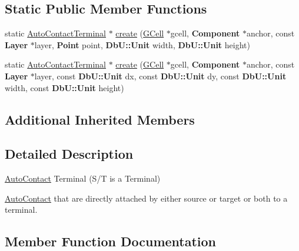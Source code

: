 \subsection*{Static Public Member Functions}
\begin{DoxyCompactItemize}
\item 
static \hyperlink{classKatabatic_1_1AutoContactTerminal}{Auto\+Contact\+Terminal} $\ast$ \hyperlink{classKatabatic_1_1AutoContactTerminal_a0d440e51525b09acc843f1d345850487}{create} (\hyperlink{classKatabatic_1_1GCell}{G\+Cell} $\ast$gcell, \textbf{ Component} $\ast$anchor, const \textbf{ Layer} $\ast$layer, \textbf{ Point} point, \textbf{ Db\+U\+::\+Unit} width, \textbf{ Db\+U\+::\+Unit} height)
\item 
static \hyperlink{classKatabatic_1_1AutoContactTerminal}{Auto\+Contact\+Terminal} $\ast$ \hyperlink{classKatabatic_1_1AutoContactTerminal_a60a625bca2cdfebcdcc7826ab781d1bb}{create} (\hyperlink{classKatabatic_1_1GCell}{G\+Cell} $\ast$gcell, \textbf{ Component} $\ast$anchor, const \textbf{ Layer} $\ast$layer, const \textbf{ Db\+U\+::\+Unit} dx, const \textbf{ Db\+U\+::\+Unit} dy, const \textbf{ Db\+U\+::\+Unit} width, const \textbf{ Db\+U\+::\+Unit} height)
\end{DoxyCompactItemize}
\subsection*{Additional Inherited Members}


\subsection{Detailed Description}
\hyperlink{classKatabatic_1_1AutoContact}{Auto\+Contact} Terminal (S/T is a Terminal) 

\hyperlink{classKatabatic_1_1AutoContact}{Auto\+Contact} that are directly attached by either source or target or both to a terminal. 

\subsection{Member Function Documentation}
\mbox{\label{classKatabatic_1_1AutoContactTerminal_a0d440e51525b09acc843f1d345850487}} 
